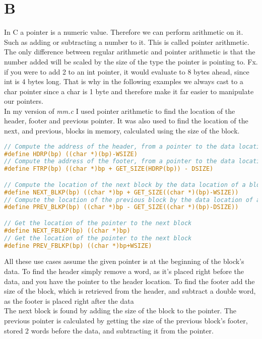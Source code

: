 \documentclass[11pt]{report}
\begin{document}
\section{B}
In C a pointer is a numeric value. Therefore we can perform arithmetic on it. Such as adding or subtracting a number to it. This is called pointer arithmetic. The only difference between regular arithmetic and pointer arithmetic is that the number added will be scaled by the size of the type the pointer is pointing to. Fx. if you were to add 2 to an int pointer, it would evaluate to 8 bytes ahead, since int is 4 bytes long. That is why in the following examples we always cast to a char pointer since a char is 1 byte and therefore make it far easier to manipulate our pointers.\\[1ex]

In my version of \textit{mm.c} I used pointer arithmetic to find the location of the header, footer and previous pointer. It was also used to find the location of the next, and previous, blocks in memory, calculated using the size of the block. 
\begin{lstlisting}[language=C]
// Compute the address of the header, from a pointer to the data location
#define HDRP(bp) ((char *)(bp)-WSIZE)
// Compute the address of the footer, from a pointer to the data location
#define FTRP(bp) ((char *)bp + GET_SIZE(HDRP(bp)) - DSIZE)

// Compute the location of the next block by the data location of a block
#define NEXT_BLKP(bp) ((char *)bp + GET_SIZE((char *)(bp)-WSIZE))
// Compute the location of the previous block by the data location of a block
#define PREV_BLKP(bp) ((char *)bp - GET_SIZE((char *)(bp)-DSIZE))

// Get the location of the pointer to the next block
#define NEXT_FBLKP(bp) ((char *)bp)
// Get the location of the pointer to the next block
#define PREV_FBLKP(bp) ((char *)bp+WSIZE)
\end{lstlisting}
All these use cases assume the given pointer is at the beginning of the block's data. To find the header simply remove a word, as it's placed right before the data, and you have the pointer to the header location. To find the footer add the size of the block, which is retrieved from the header, and subtract a double word, as the footer is placed right after the data\\[1ex]

The next block is found by adding the size of the block to the pointer. The previous pointer is calculated by getting the size of the previous block's footer, stored 2 words before the data, and subtracting it from the pointer.\\[1ex]
\end{document}

